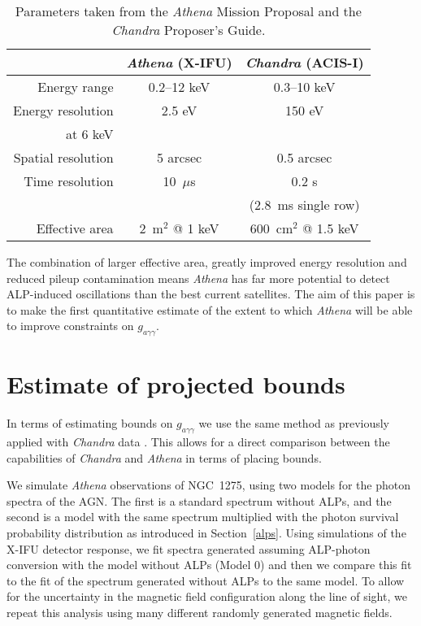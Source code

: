 \documentclass[fleqn,usenatbib,useAMS]{mnras}
\begin{document}
\begin{table}

\centering
\begin{tabular}{r|c|c}
& {\it Athena} (X-IFU) & {\it Chandra} (ACIS-I)\\
\hline\hline
Energy range & 0.2--12 keV & 0.3--10 keV\\ \hline
Energy resolution & 2.5 eV & 150 eV\\ 
 at 6 keV & & \\ \hline
Spatial resolution & 5 arcsec & 0.5 arcsec\\ \hline
Time resolution & 10~$\mu$s & 0.2 s\\
& & (2.8~ms single row)\\ \hline
Effective area & 2~m$^2$ @ 1 keV & 600~cm$^2$ @ 1.5 keV \\ \hline
\end{tabular}
\caption{Parameters taken from the {\it Athena} Mission Proposal and the {\it Chandra} Proposer's Guide.}
\label{satellites}
\end{table}

The combination of larger effective area, greatly improved energy resolution and reduced pileup contamination means {\it Athena} has far more potential to detect ALP-induced oscillations than the best current satellites. The aim of this paper is
to make the first quantitative estimate of the extent to which {\it Athena} will be able to improve constraints on
$g_{a\gamma\gamma}$.

\section{Estimate of projected bounds}
\label{bounds}
In terms of estimating bounds on $g_{a\gamma\gamma}$ we use the same method as previously applied with
{\it Chandra} data \cite{Berg:2016ese}. This allows for a direct comparison
between the capabilities of {\it Chandra} and {\it Athena} in terms of placing bounds.

We simulate {\it Athena} observations of NGC~1275, using two models for the photon spectra of the AGN.
The first is a standard spectrum without ALPs, and the second is a model with the same spectrum multiplied with the
photon survival probability distribution as introduced in Section~\ref{alps}. Using simulations of the
X-IFU detector response, we fit spectra generated assuming ALP-photon conversion with the model without ALPs (Model 0) and then we compare this fit to the fit of the spectrum generated without ALPs to the same model.
To allow for the uncertainty in the
magnetic field configuration along the line of sight, we repeat this analysis using many different randomly generated magnetic fields.
\end{document}
